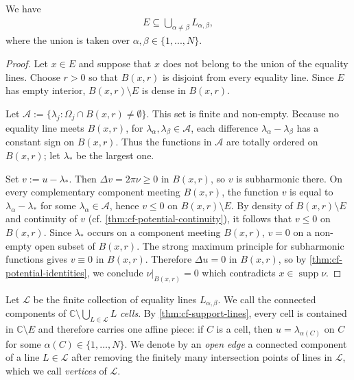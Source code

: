 \documentclass[11pt,a4paper,english,reqno]{amsart}
\numberwithin{equation}{section}
\newcommand{\CC}[0]{\mathbb{C}}
\renewcommand{\subset}{\subseteq}
\DeclareMathOperator{\supp}{supp}
\renewcommand{\restriction}{\big|}
\numberwithin{definition}{section}
\begin{document}
\begin{lemma}\label{thm:cf-support-lines}
  We have
  \begin{align}
    E\subset \bigcup_{α\neq β}L_{α,β},
  \end{align}
  where the union is taken over $α,β\in\{1,...,N\}$.
\end{lemma}
\begin{proof}
  Let $x\in E$ and suppose that $x$ does not belong to the union of the equality lines.
  Choose $r>0$ so that $B(x,r)$ is disjoint from every equality line.
  Since $E$ has empty interior, $B(x,r)\setminus E$ is dense in $B(x,r)$.

  Let $\mathcal A := \{ λ_j : Ω_j \cap B(x,r)\neq \emptyset\}$.
  This set is finite and non-empty.
  Because no equality line meets $B(x,r)$, for $λ_α,λ_β\in\mathcal A$, each difference $λ_α-λ_β$ has a constant sign on $B(x,r)$.
  Thus the functions in $\mathcal A$ are totally ordered on $B(x,r)$; let $λ_*$ be the largest one.

  Set $v:=u-λ_*$.
  Then $\Delta v=2πν\ge0$ in $B(x,r)$, so $v$ is subharmonic there.
  On every complementary component meeting $B(x,r)$, the function $v$ is equal to $λ_α-λ_*$ for some $λ_α\in\mathcal A$, hence $v\le0$ on $B(x,r)\setminus E$.
  By density of $B(x,r)\setminus E$ and continuity of $v$ (cf. \cref{thm:cf-potential-continuity}), it follows that $v\le0$ on $B(x,r)$.
  Since $λ_*$ occurs on a component meeting $B(x,r)$, $v=0$ on a non-empty open subset of $B(x,r)$.
  The strong maximum principle for subharmonic functions gives $v\equiv0$ in $B(x,r)$.
  Therefore $\Delta u=0$ in $B(x,r)$, so by \cref{thm:cf-potential-identities}, we conclude $ν\restriction_{B(x,r)}=0$ which contradicts $x\in\supp ν$.
\end{proof}

Let $\mathcal L$ be the finite collection of equality lines $L_{α,β}$.
We call the connected components of $\CC\setminus\bigcup_{L\in\mathcal L}L$ \emph{cells}.
By \cref{thm:cf-support-lines}, every cell is contained in $\CC\setminus E$ and therefore carries one affine piece: if $C$ is a cell, then $u=λ_{α(C)}$ on $C$ for some $α(C)\in\{1,\dots,N\}$.
We denote by an \emph{open edge} a connected component of a line $L\in\mathcal L$ after removing the finitely many intersection points of lines in $\mathcal L$, which we call \emph{vertices} of $\mathcal L$.
\end{document}

